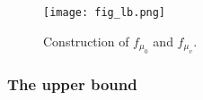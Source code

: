 \documentclass[11pt,a4paper]{article}
\begin{document}





\begin{figure}[h!]
	\centering
    \texttt{[image: fig\_lb.png]}
  \caption{Construction of $f_{\mu_0}$ and $f_{\mu_v}$.\protect\footnotemark}
  \label{fig:lb}
\end{figure}


\subsubsection{The upper bound}

\end{document}
